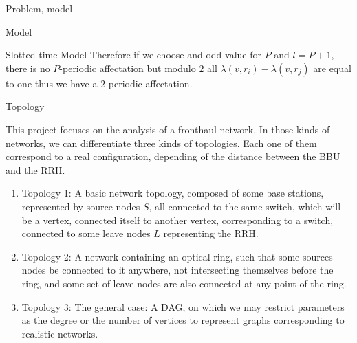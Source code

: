 \documentclass[a4paper,10pt]{report}
\begin{document}
\begin{chapter}{Problem, model}
\begin{section}{Model}
\begin{subsection}{Slotted time Model}
{{Therefore if we choose and odd value for $P$ and $l=P+1$, there is no $P$-periodic affectation but modulo $2$ all $\lambda(v,r_i) - \lambda(v,r_j)$
are equal to one thus we have a $2$-periodic affectation. 
}}
\end{subsection}
\begin{subsection}{Topology}

This project focuses on the analysis of a fronthaul network. In those kinds of networks, we can differentiate three kinds of
topologies. Each one of them correspond to a real configuration, depending of the distance between the BBU and the RRH.
\begin{enumerate}
 \item Topology 1: A basic network topology, composed of some base stations, represented by source nodes $S$, all connected to the same switch,
which will be a vertex, connected itself to another vertex, corresponding to a switch, connected to some leave nodes $L$ representing the RRH.
\item Topology 2: A network containing an optical ring, such that some sources nodes be connected to it anywhere, not intersecting themselves before the ring,
and some set of leave nodes are also connected at any point of the ring.
\item Topology 3: The general case: A DAG, on which we may restrict parameters as the degree or the number of vertices to represent graphs corresponding to realistic networks.
\end{enumerate}
\end{subsection}
\end{section}
\end{chapter}
\end{document}
